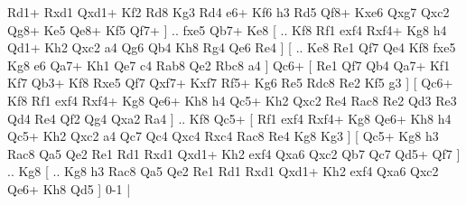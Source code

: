 Rd1+  Rxd1 Qxd1+  Kf2 Rd8  Kg3 Rd4  e6+ Kf6  h3 Rd5  Qf8+ Kxe6  Qxg7 Qxc2  Qg8+ Ke5  Qe8+ Kf5  Qf7+   ] .. fxe5    Qb7+   Ke8 [ .. Kf8  Rf1 exf4  Rxf4+ Kg8  h4 Qd1+  Kh2 Qxc2  a4 Qg6  Qb4 Kh8  Rg4 Qe6  Re4   ]  [ .. Ke8  Re1 Qf7  Qe4 Kf8  fxe5 Kg8  e6 Qa7+  Kh1 Qe7  c4 Rab8  Qe2 Rbc8  a4   ]  Qc6+ [  Re1 Qf7  Qb4 Qa7+  Kf1 Kf7  Qb3+ Kf8  Rxe5 Qf7  Qxf7+ Kxf7  Rf5+ Kg6  Re5 Rdc8  Re2 Kf5  g3   ]  [  Qc6+ Kf8  Rf1 exf4  Rxf4+ Kg8  Qe6+ Kh8  h4 Qc5+  Kh2 Qxc2  Re4 Rac8  Re2 Qd3  Re3 Qd4  Re4 Qf2  Qg4 Qxa2  Ra4   ] .. Kf8    Qc5+ [  Rf1 exf4  Rxf4+ Kg8  Qe6+ Kh8  h4 Qc5+  Kh2 Qxc2  a4 Qc7  Qc4 Qxc4  Rxc4 Rac8  Re4 Kg8  Kg3   ]  [  Qc5+ Kg8  h3 Rac8  Qa5 Qe2  Re1 Rd1  Rxd1 Qxd1+  Kh2 exf4  Qxa6 Qxc2  Qb7 Qc7  Qd5+ Qf7   ] .. Kg8    [ .. Kg8  h3 Rac8  Qa5 Qe2  Re1 Rd1  Rxd1 Qxd1+  Kh2 exf4  Qxa6 Qxc2  Qe6+ Kh8  Qd5   ] 0-1  |
